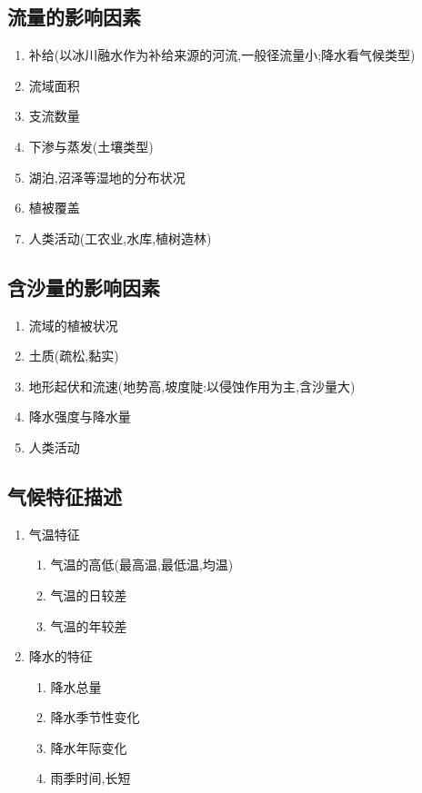 \documentclass[a4paper]{article}
\begin{document}
    \subsection{流量的影响因素}
    \begin{enumerate}
        \item 补给(以冰川融水作为补给来源的河流,一般径流量小;降水看气候类型)
        \item 流域面积
        \item 支流数量
        \item 下渗与蒸发(土壤类型)
        \item 湖泊,沼泽等湿地的分布状况
        \item 植被覆盖
        \item 人类活动(工农业,水库,植树造林)
    \end{enumerate}
    \subsection{含沙量的影响因素}
    \begin{enumerate}
        \item 流域的植被状况
        \item 土质(疏松,黏实)
        \item 地形起伏和流速(地势高,坡度陡:以侵蚀作用为主,含沙量大)
        \item 降水强度与降水量
        \item 人类活动
    \end{enumerate}
    \subsection{气候特征描述}
    \begin{enumerate}
        \item 气温特征
        \begin{enumerate}
            \item 气温的高低(最高温,最低温,均温)
            \item 气温的日较差
            \item 气温的年较差
        \end{enumerate}
        \item 降水的特征
        \begin{enumerate}
            \item 降水总量
            \item 降水季节性变化
            \item 降水年际变化
            \item 雨季时间,长短
        \end{enumerate}
    \end{enumerate}
\end{document}
